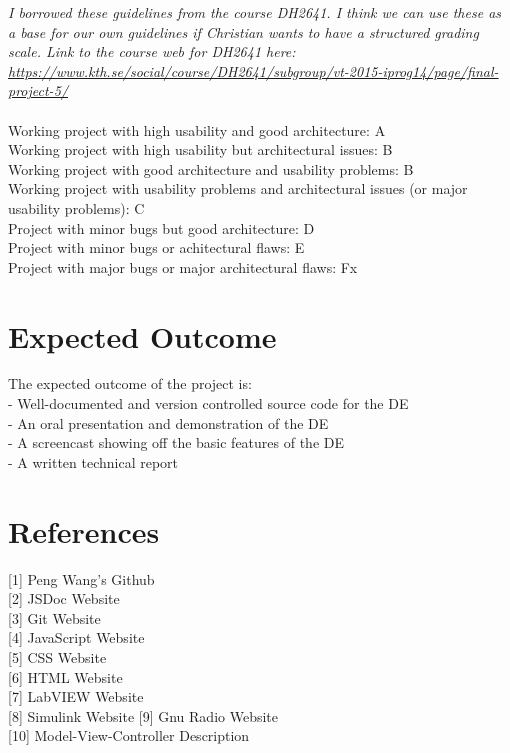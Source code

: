 \documentclass[11pt]{article} %
\begin{document}
\textit{I borrowed these guidelines from the course DH2641. I think we can use these as a base for our own guidelines if Christian wants to have a structured grading scale. Link to the course web for DH2641 here:\\
\url{https://www.kth.se/social/course/DH2641/subgroup/vt-2015-iprog14/page/final-project-5/}}
\\\\
Working project with high usability and good architecture: A\\
Working project with high usability but architectural issues: B\\
Working project with good architecture and usability problems: B\\
Working project with usability problems and architectural issues (or major usability problems): C\\
Project with minor bugs but good architecture: D\\
Project with minor bugs or achitectural flaws: E\\
Project with major bugs or major architectural flaws: Fx\\

\section*{Expected Outcome}
The expected outcome of the project is:\\
- Well-documented and version controlled source code for the DE\\
- An oral presentation and demonstration of the DE\\
- A screencast showing off the basic features of the DE\\
- A written technical report

\section*{References}
[1] Peng Wang's Github \\
{[2]} JSDoc Website \\
{[3]} Git Website \\
{[4]} JavaScript Website \\
{[5]} CSS Website \\
{[6]} HTML Website \\
{[7]} LabVIEW Website \\
{[8]} Simulink Website
{[9]} Gnu Radio Website \\
{[10]} Model-View-Controller Description
\end{document}

